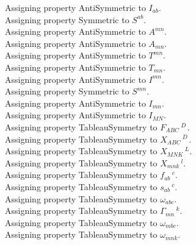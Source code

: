 \documentclass[11pt]{article}
\begin{document}
Assigning property AntiSymmetric to ${I}_{a b}$.
\\
Assigning property Symmetric to ${S}^{a b}$.
\\
Assigning property AntiSymmetric to ${A}^{m n}$.
\\
Assigning property AntiSymmetric to ${A}_{m n}$.
\\
Assigning property AntiSymmetric to ${T}^{m n}$.
\\
Assigning property AntiSymmetric to ${T}_{m n}$.
\\
Assigning property AntiSymmetric to ${I}^{m n}$.
\\
Assigning property Symmetric to ${S}^{m n}$.
\\
Assigning property AntiSymmetric to ${I}_{m n}$.
\\
Assigning property AntiSymmetric to ${I}_{M N}$.
\\
Assigning property TableauSymmetry to ${F}_{A B C}\,^{D\, }$.
\\
Assigning property TableauSymmetry to ${X}_{A B C}\,^{D\, }$.
\\
Assigning property TableauSymmetry to ${X}_{M N K}\,^{L}$.
\\
Assigning property TableauSymmetry to ${X}_{m n k}\,^{l}$.
\\
Assigning property TableauSymmetry to ${f}_{a b}\,^{c}$.
\\
Assigning property TableauSymmetry to ${s}_{a b}\,^{c}$.
\\
Assigning property TableauSymmetry to ${\omega}_{a b c}$.
\\
Assigning property TableauSymmetry to ${\Gamma}_{m n}\,^{k}$.
\\
Assigning property TableauSymmetry to ${\omega}_{m b c}$.
\\
Assigning property TableauSymmetry to ${\omega}_{m n k}$.
\end{document}
